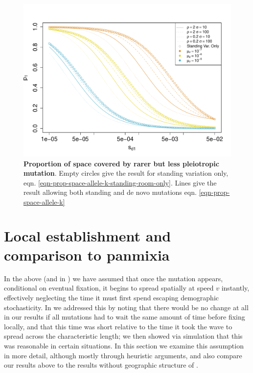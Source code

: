 \documentclass{article}
\begin{document}
\begin{figure}[ht]
\begin{center}
  \includegraphics[width=1.0\textwidth]{pleiotropy_calc}
\caption{ %
{\bf Proportion of space covered by rarer but less pleiotropic
  mutation}. Empty circles give the result for standing variation only,
  eqn. \eqref{eqn-prop-space-allele-k-standing-room-only}. Lines give
  the result allowing both standing and de novo mutations  eqn. \eqref{eqn-prop-space-allele-k}}   \label{fig-pleiotropy_calc}
\end{center}
\end{figure}


\section{Local establishment and comparison to panmixia}

In the above (and in \citet{ralphcoop2010}) we have assumed that once the mutation appears,
conditional on eventual fixation, it begins to spread spatially at speed $v$ instantly,
effectively neglecting the time it must first spend escaping demographic stochasticity.
In \citet{ralphcoop2010} we addressed this by noting that there would be no change at all in our results 
if all mutations had to wait the same amount of time before fixing locally,
and that this time was short relative to the time it took the wave to spread across the characteristic length;
we then showed via simulation that this was reasonable in certain situations.
In this section we examine this assumption in more detail, although mostly through heuristic arguments,
and also compare our results above to the results without geographic structure of \citet{softsweeps}.
\end{document}
